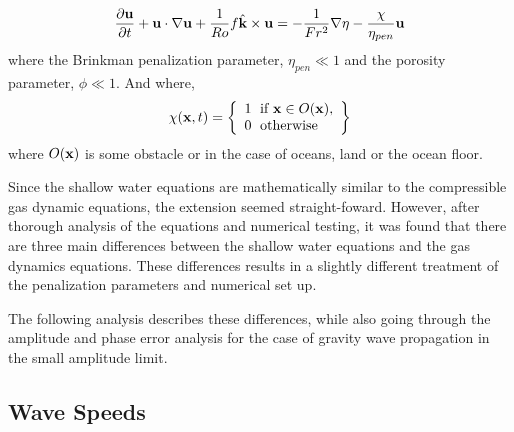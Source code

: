 \begin{equation*} \label{e:swe_momentum_bp}
\frac{\partial {\bf u}}{\partial t} + {\bf u} \cdot \nabla {\bf u} + \frac{1}{Ro} f \hat{\bf k} \times {\bf u} = - \frac{1}{Fr^2} \nabla \eta - \frac{\chi}{\eta_{pen}} {\bf u}
\end{equation*}
%
where the Brinkman penalization parameter, $\eta_{pen} \ll 1$ and the porosity parameter, $\phi \ll 1$.  And where, 
%
\begin{equation*} \label{e:chi}
\chi ({\bf x},t) = \left \{ \begin{array}{l} 1 \; \mbox{ if } {\bf x} \in O({\bf x}), \\ 0 \; \mbox{ otherwise}
\end{array} \right \}
\end{equation*}
%
where $O({\bf x})$ is some obstacle or in the case of oceans, land or the ocean floor.

Since the shallow water equations are mathematically similar to the compressible gas dynamic equations, the extension seemed straight-foward.  However, after thorough analysis of the equations and numerical testing, it was found that there are three main differences between the shallow water equations and the gas dynamics equations.  These differences results in a slightly different treatment of the penalization parameters and numerical set up.  

The following analysis describes these differences, while also going through the amplitude and phase error analysis for the case of gravity wave propagation in the small amplitude limit.  

\subsection{Wave Speeds}

